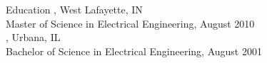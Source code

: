 \begin{category}{Education}
, West Lafayette, IN\\
Master of Science in Electrical Engineering, August 2010\\
, Urbana, IL\\
Bachelor of Science in Electrical Engineering, August 2001\\
\end{category}
